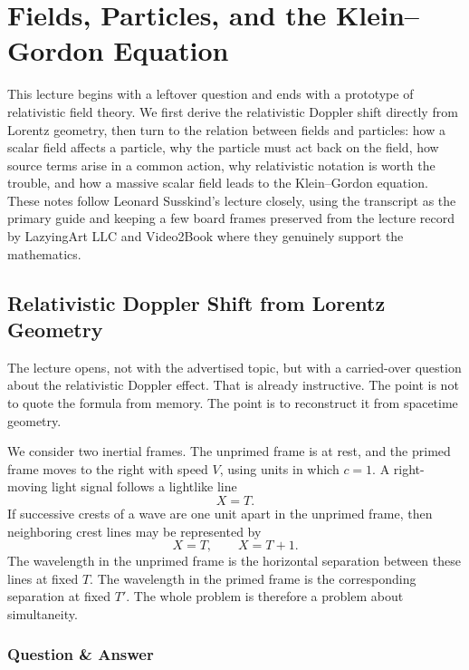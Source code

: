 \chapter{Fields, Particles, and the Klein--Gordon Equation}

This lecture begins with a leftover question and ends with a prototype of relativistic field theory. We first derive the relativistic Doppler shift directly from Lorentz geometry, then turn to the relation between fields and particles: how a scalar field affects a particle, why the particle must act back on the field, how source terms arise in a common action, why relativistic notation is worth the trouble, and how a massive scalar field leads to the Klein--Gordon equation. These notes follow Leonard Susskind's lecture closely, using the transcript as the primary guide and keeping a few board frames preserved from the lecture record by LazyingArt LLC and Video2Book where they genuinely support the mathematics.

\section{Relativistic Doppler Shift from Lorentz Geometry}

The lecture opens, not with the advertised topic, but with a carried-over question about the relativistic Doppler effect. That is already instructive. The point is not to quote the formula from memory. The point is to reconstruct it from spacetime geometry.

We consider two inertial frames. The unprimed frame is at rest, and the primed frame moves to the right with speed \(V\), using units in which \(c=1\). A right-moving light signal follows a lightlike line
\begin{equation}
X=T.
\end{equation}
If successive crests of a wave are one unit apart in the unprimed frame, then neighboring crest lines may be represented by
\begin{equation}
X=T,
\qquad
X=T+1.
\end{equation}
The wavelength in the unprimed frame is the horizontal separation between these lines at fixed \(T\). The wavelength in the primed frame is the corresponding separation at fixed \(T'\). The whole problem is therefore a problem about simultaneity.

\subsection{Question \& Answer}

